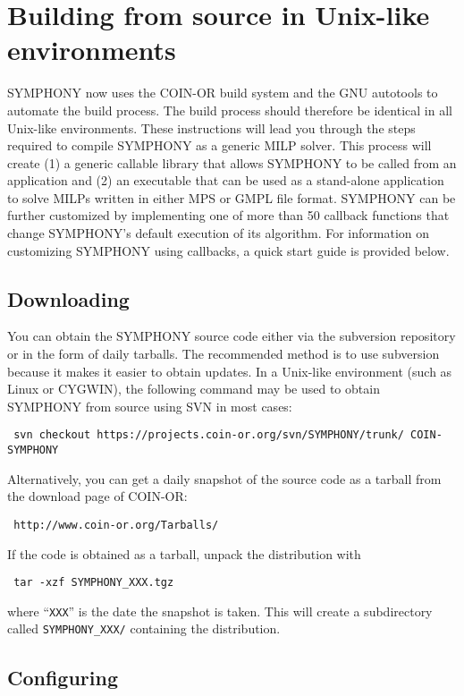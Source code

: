 \section{Building from source in Unix-like environments}
\label{getting_started_unix}

SYMPHONY now uses the COIN-OR build system and the GNU autotools to automate
the build process. The build process should therefore be identical in all
Unix-like environments. These instructions will lead you through the steps
required to compile SYMPHONY as a generic MILP solver. This process will
create (1) a generic callable library that allows SYMPHONY to be called from
an application and (2) an executable that can be used as a stand-alone
application to solve MILPs written in either MPS or GMPL file format. SYMPHONY
can be further customized by implementing one of more than 50 callback
functions that change SYMPHONY's default execution of its algorithm. For
information on customizing SYMPHONY using callbacks, a quick start guide is
provided below.

\subsection{Downloading}

You can obtain the SYMPHONY source code either via the subversion repository
or in the form of daily tarballs. The recommended method is to use subversion
because it makes it easier to obtain updates. In a Unix-like environment (such
as Linux or CYGWIN), the following command may be used to obtain SYMPHONY from
source using SVN in most cases:
{\color{Brown}
\begin{verbatim}
 svn checkout https://projects.coin-or.org/svn/SYMPHONY/trunk/ COIN-SYMPHONY
\end{verbatim}
}
Alternatively, you can get a daily snapshot of the source code as a tarball
from the download page of COIN-OR:
{\color{Brown}
\begin{verbatim}
 http://www.coin-or.org/Tarballs/
\end{verbatim}
}
If the code is obtained as a tarball, unpack the distribution with 
{\color{Brown}
\begin{verbatim}
 tar -xzf SYMPHONY_XXX.tgz
\end{verbatim}
}
where ``\texttt{XXX}'' is the date the snapshot is taken. This will create a
subdirectory called \texttt{SYMPHONY\_XXX/} containing the distribution.

\subsection{Configuring}\label{configuring}

